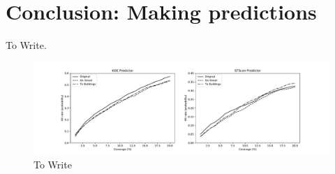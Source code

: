 \documentclass[twoside,a4paper,twocolumn,10pt]{article}
\theoremstyle{plain}
\theoremstyle{definition}
\begin{document}
\section{Conclusion: Making predictions}

To Write.

\begin{figure}
  \includegraphics[width=\textwidth]{hit_rates.pdf}
  \caption{To Write}
  \label{fig:hit_rates}
\end{figure}
\end{document}
